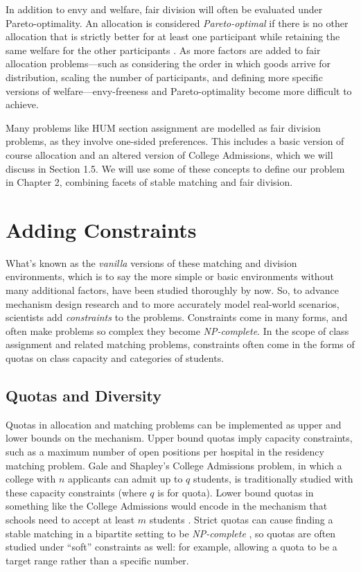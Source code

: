 In addition to envy and welfare, fair division will often be evaluated under
Pareto-optimality. An allocation is considered \textit{Pareto-optimal} if there
is no other allocation that is strictly better for at least one participant
while retaining the same welfare for the other participants \cite{pareto}. As more factors
are added to fair allocation problems—such as considering the order in which
goods arrive for distribution, scaling the number of participants, and defining more
specific versions of welfare—envy-freeness and Pareto-optimality become more
difficult to achieve.

Many problems like HUM section assignment are modelled as fair division
problems, as they involve one-sided preferences. This includes a basic version of
course allocation and an altered version of College Admissions, which we will
discuss in Section 1.5. We will use some of these concepts to define our problem
in Chapter 2, combining facets of stable matching and fair division.

\section{Adding Constraints}

What’s known as the \textit{vanilla} versions of these matching and division
environments, which is to say the more simple or basic environments without many
additional factors, have been
studied thoroughly by now. So, to advance mechanism design research and to more
accurately model real-world scenarios, scientists add \textit{constraints} to
the problems. Constraints come in many forms, and often make problems so complex
they become \textit{NP-complete}. In the scope of class assignment and related matching
problems, constraints often come in the forms of quotas on class capacity and
categories of students.

\subsection{Quotas and Diversity}

Quotas in allocation and matching problems can be implemented as upper and lower
bounds on the mechanism. Upper bound quotas imply capacity constraints, such as
a maximum number of open positions per hospital in the residency matching
problem. Gale and Shapley’s College Admissions problem, in which a college with
$n$ applicants can admit up to $q$ students, is traditionally studied with these
capacity constraints (where $q$ is for quota). Lower bound quotas in something
like the College Admissions would encode in the mechanism that schools need to
accept at least $m$ students \cite{quotas}. Strict quotas can cause
finding a stable matching in a bipartite setting
to be \textit{NP-complete} \cite{santhini}, so quotas are often studied under “soft”
constraints as well: for example, allowing a quota to be a target range rather
than a specific number.

